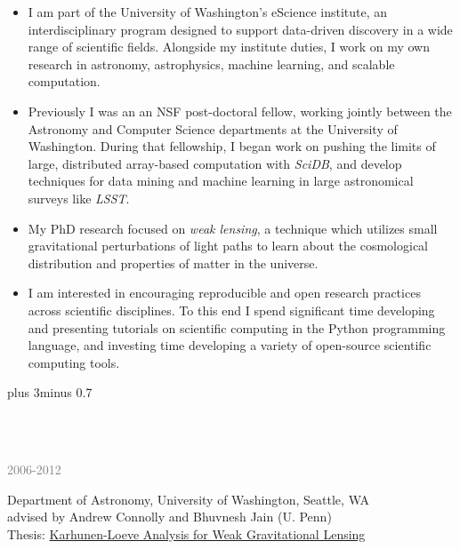 \documentclass{article} %
\def\bf{\bfseries}
\def\sf{\sffamily}
\def\sl{\slshape}
\newlength\sidebarwidth
\newcommand{\topic}[3][]%
	 {\pagebreak[2]%
	 \vskip 1.5\baselineskip plus 3\baselineskip minus 0.7\baselineskip
	 \begin{minipage}{\textwidth}
         \phantomsection\addcontentsline{toc}{section}{#1}%
         \nopagebreak\hspace{0in}%
         \nopagebreak\begin{minipage}[t]{\sidebarwidth - .2cm}
         \raggedleft \bf\sf
	 \color{deep_blue}{\Large #2}
	 \end{minipage}%
	 \hfill
	 \begin{minipage}[t]{\linewidth - \sidebarwidth}
	 \nopagebreak{\color{deep_blue}%
		    \rule{0pt}{\baselineskip}%
		    \rule{\linewidth}{2.5pt}%
		    \llap{\raisebox{.3\baselineskip}{\sf #1}}%
		    \vspace*{.1\baselineskip}%
		    }%
	 #3%
	 \end{minipage}
	 \end{minipage}}
\newcommand{\subtopic}[3][]
	 {\begin{minipage}{\textwidth}
	 \vspace*{.4\baselineskip}
         \nopagebreak\hspace{0in}%
         \nopagebreak\begin{minipage}[t]{\sidebarwidth - .2cm}
         \raggedleft {\sf\fontseries{sbc}\selectfont #2}
         {\\[-0.2\baselineskip] \textcolor{gray}{\footnotesize #1}}
	 \end{minipage}%
	 \hfill
	 \begin{minipage}[t]{\linewidth - \sidebarwidth}
	 #3%
	 \end{minipage}%
	 \vspace*{.2\baselineskip plus 1\baselineskip minus
	 .2\baselineskip}%
	 \end{minipage}}
\def\mydot{\textcolor{deep_blue}{\rule{1ex}{1ex}}}
\begin{document}
\begin{multicols}{2}
\sloppy


\begin{itemize}[leftmargin=2ex, itemsep=0ex]
\item[\mydot]
I am part of the University of Washington's eScience institute, an
interdisciplinary program designed to support data-driven discovery in a
wide range of scientific fields.  Alongside my institute duties, I work on
my own research in astronomy, astrophysics, machine learning, and
scalable computation.

\item[\mydot]
Previously I was an an NSF post-doctoral fellow,
working jointly between the Astronomy and Computer Science departments
at the University of Washington. During that fellowship, I began work on
pushing the limits of large, distributed array-based computation with
{\it SciDB}, and develop techniques for data mining and machine learning
in large astronomical surveys like {\it LSST}.

\item[\mydot]
My PhD research focused on {\it weak lensing}, a technique which utilizes small
gravitational perturbations of light paths to learn about the cosmological
distribution and properties of matter in the universe.

\item[\mydot]
I am interested in encouraging reproducible and open research practices
across scientific disciplines.  To this end I spend significant time
developing and presenting tutorials on scientific computing in the Python
programming language, and investing time developing a variety of open-source
scientific computing tools.

\end{itemize}
\end{multicols}
\vspace*{-1.5em}
\fussy

\topic{E \large\hskip -1ex DUCATION}{~}

    \subtopic[2006-2012]{\bf PhD}{
        Department of Astronomy, University of Washington, Seattle, WA\\
        advised by Andrew Connolly and Bhuvnesh Jain (U. Penn)\\
	Thesis: \href{http://adsabs.harvard.edu/abs/2013arXiv1301.6657V}{
          Karhunen-Loeve Analysis for Weak Gravitational Lensing}
    }
\end{document}
